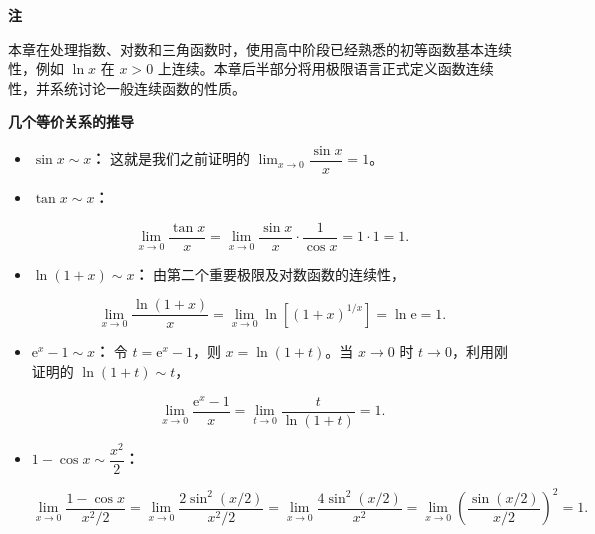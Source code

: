\documentclass[fontset=fandol]{ctexart}
\newenvironment{custom}[1]{\par\noindent\textbf{#1}\quad}{\par\vspace{0.8em}}
\newenvironment{remark}{\par\noindent\textbf{注}\quad}{\par\vspace{0.8em}}
\newcommand{\ee}{\mathrm{e}}
\begin{document}
\begin{remark}

本章在处理指数、对数和三角函数时，使用高中阶段已经熟悉的初等函数基本连续性，例如 $\ln x$ 在 $x>0$ 上连续。本章后半部分将用极限语言正式定义函数连续性，并系统讨论一般连续函数的性质。

\end{remark}



\begin{custom}{几个等价关系的推导}



\begin{itemize}

\item \textbf{\(\sin x \sim x\)：} 这就是我们之前证明的 \(\lim_{x \to 0} \dfrac{\sin x}{x} = 1\)。



\item \textbf{\(\tan x \sim x\)：} 

\[

\lim_{x \to 0} \dfrac{\tan x}{x} = \lim_{x \to 0} \dfrac{\sin x}{x} \cdot \dfrac{1}{\cos x} = 1 \cdot 1 = 1.

\]



\item \textbf{\(\ln(1+x)\sim x\)：} 由第二个重要极限及对数函数的连续性，

\[

\lim_{x\to0}\frac{\ln(1+x)}{x}

=\lim_{x\to0}\ln\!\left[(1+x)^{1/x}\right]

=\ln\ee=1.

\]



\item \textbf{\(\ee^x-1\sim x\)：} 令 \(t=\ee^x-1\)，则 \(x=\ln(1+t)\)。当 \(x\to0\) 时 \(t\to0\)，利用刚证明的 \(\ln(1+t)\sim t\)，

\[

\lim_{x\to0}\frac{\ee^x-1}{x}

=\lim_{t\to0}\frac{t}{\ln(1+t)}=1.

\]



\item \textbf{\(1 - \cos x \sim \dfrac{x^2}{2}\)：} 

\[

\lim_{x \to 0} \dfrac{1 - \cos x}{x^2/2} = \lim_{x \to 0} \dfrac{2 \sin^2(x/2)}{x^2/2} = \lim_{x \to 0} \dfrac{4 \sin^2(x/2)}{x^2} = \lim_{x \to 0} \left(\dfrac{\sin(x/2)}{x/2}\right)^2 = 1.

\]
\end{itemize}
\end{custom}
\end{document}
